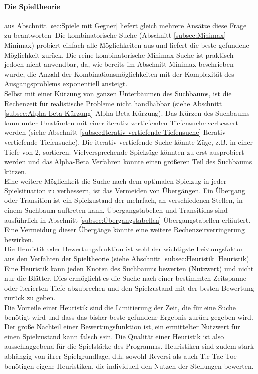 \paragraph{Die Spieltheorie} aus Abschnitt \ref{sec:Spiele mit Gegner} liefert gleich mehrere Ansätze diese Frage zu beantworten. Die kombinatorische Suche (Abschnitt \ref{subsec:Minimax} Minimax) probiert einfach alle Möglichkeiten aus und liefert die beste gefundene Möglichkeit zurück. Die reine kombinatorische Minimax Suche ist praktisch jedoch nicht anwendbar, da, wie bereits im Abschnitt Minimax beschrieben wurde, die Anzahl der Kombinationsmöglichkeiten mit der Komplexität des Ausgangsproblems exponentiell ansteigt. \\

Selbst mit einer Kürzung von ganzen Unterbäumen des Suchbaums, ist die Rechenzeit für realistische Probleme nicht handhabbar (siehe Abschnitt \ref{subsec:Alpha-Beta-Kürzung} Alpha-Beta-Kürzung). Das Kürzen des Suchbaums kann unter Umständen mit einer iterativ vertiefenden Tiefensuche verbessert werden (siehe Abschnitt \ref{subsec:Iterativ vertiefende Tiefensuche} Iterativ vertiefende Tiefensuche). Die iterativ vertiefende Suche könnte Züge, z.B. in einer Tiefe von 2, sortieren. Vielversprechende Spielzüge könnten zu erst ausprobiert werden und das Alpha-Beta Verfahren könnte einen größeren Teil des Suchbaums kürzen. \\

Eine weitere Möglichkeit die Suche nach dem optimalen Spielzug in jeder Spielsituation zu verbessern, ist das Vermeiden von Übergängen. Ein Übergang oder Transition ist ein Spielzustand der mehrfach, an verschiedenen Stellen, in einem Suchbaum auftreten kann. Übergangstabellen und Transitions sind ausführlich in Abschnitt \ref{subsec:Übergangstabellen} Übergangstabellen erläutert. Eine Vermeidung dieser Übergänge könnte eine weitere Rechenzeitverringerung bewirken. \\

Die Heuristik oder Bewertungsfunktion ist wohl der wichtigste Leistungsfaktor aus den Verfahren der Spieltheorie (siehe Abschnitt \ref{subsec:Heuristik} Heuristik). Eine Heuristik kann jeden Knoten des Suchbaums bewerten (Nutzwert) und nicht nur die Blätter. Dies ermöglicht es die Suche nach einer bestimmten Zeitspanne oder iterierten Tiefe abzubrechen und den Spielzustand mit der besten Bewertung zurück zu geben. \\

Die Vorteile einer Heuristik sind die Limitierung der Zeit, die für eine Suche benötigt wird und dass das bisher beste gefundene Ergebnis zurück gegeben wird. Der große Nachteil einer Bewertungsfunktion ist, ein ermittelter Nutzwert für einen Spielzustand kann falsch sein. Die Qualität einer Heuristik ist also ausschlaggebend für die Spielstärke des Programms. Heuristiken sind zudem stark abhängig von ihrer Spielgrundlage, d.h. sowohl Reversi als auch Tic Tac Toe benötigen eigene Heuristiken, die individuell den Nutzen der Stellungen bewerten. \\

